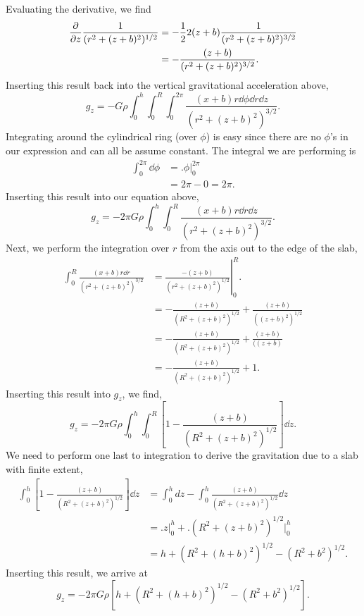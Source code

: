 Evaluating the derivative, we find
\begin{align*}
    \pdv{}{z} \frac{1}{(r^2 + (z + b)^2)^{1/2}}
    &= -\frac{1}{2} 2 (z + b) \frac{1}{(r^2 + (z + b)^2)^{3/2}} \\
    &= -\frac{(z + b)}{(r^2 + (z + b)^2)^{3/2}} .
\end{align*}
Inserting this result back into the vertical gravitational acceleration above,
\begin{equation*}
    g_z = -G \rho \int_0^h \int_0^R \int_0^{2\pi} 
    \frac{(x + b) r \dd{\phi} \dd{r} \dd{z}}{(r^2 + (z + b)^2)^{3/2}} .
\end{equation*}
Integrating around the cylindrical ring (over $\phi$) is easy since there are no
$\phi$'s in our expression and can all be assume constant.  The integral we are
performing is
\begin{align*}
    \int_0^{2\pi} \dd{\phi} &= \bigl. \phi \bigr|_0^{2\pi} \\
    &= 2\pi - 0 = 2\pi .
\end{align*}
Inserting this result into our equation above,
\begin{equation*}
    g_z = -2 \pi G \rho \int_0^h \int_0^R
    \frac{(x + b) r \dd{r} \dd{z}}{(r^2 + (z + b)^2)^{3/2}} .
\end{equation*}
Next, we perform the integration over $r$ from the axis out to the edge of the
slab,
\begin{align*}
    \int_0^R \frac{(x + b) r \dd{r}}{(r^2 + (z + b)^2)^{3/2}} 
    &= \left.  \frac{-(z + b)}{(r^2 + (z + b)^2)^{1/2}} \right|_0^R. \\
    &= -\frac{(z + b)}{(R^2 + (z + b)^2)^{1/2}} + \frac{(z + b)}{((z + b)^2)^{1/2}} \\
    &= -\frac{(z + b)}{(R^2 + (z + b)^2)^{1/2}} + \frac{(z + b)}{((z + b)} \\
    &= -\frac{(z + b)}{(R^2 + (z + b)^2)^{1/2}} + 1 .
\end{align*}
Inserting this result into $g_z$, we find,
\begin{equation*}
    g_z = -2 \pi G \rho \int_0^h \int_0^R
    \left[ 1 - \frac{(z + b)}{(R^2 + (z + b)^2)^{1/2}} \right] \dd{z} .
\end{equation*}
We need to perform one last to integration to derive the gravitation due to a slab with finite extent,
\begin{align*}
    \int_0^h \left[ 1 - \frac{(z + b)}{(R^2 + (z + b)^2)^{1/2}} \right] \dd{z} 
    &= \int_0^h dz - \int_0^h \frac{(z + b)}{(R^2 + (z + b)^2)^{1/2}} \dd{z} \\
    &= \bigl. z \bigr|_0^h + \bigl. (R^2 + (z + b)^2)^{1/2} \bigr|_0^h \\
    &= h + (R^2 + (h + b)^2)^{1/2} - (R^2 + b^2)^{1/2} .
\end{align*}
Inserting this result, we arrive at
\begin{equation}
    g_z = -2 \pi G \rho [h + (R^2 + (h + b)^2)^{1/2} - (R^2 + b^2)^{1/2}] .
\end{equation}

